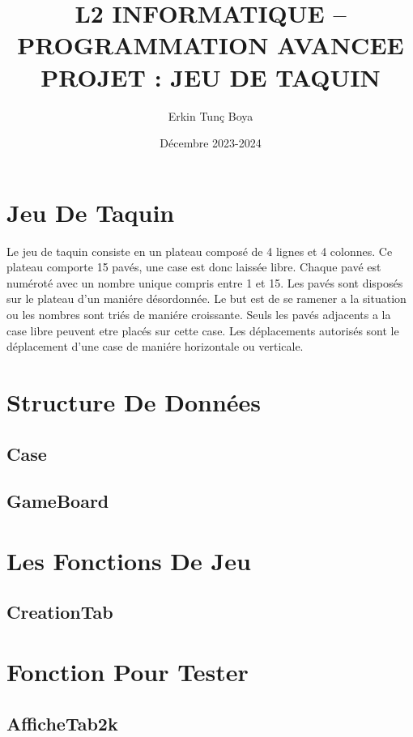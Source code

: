 \documentclass{article}
\title{L2 INFORMATIQUE – PROGRAMMATION AVANCEE \\ PROJET : JEU DE TAQUIN}
\author{Erkin Tunç Boya}
\date{Décembre 2023-2024}
\begin{document}
\maketitle
\tableofcontents
\newpage


\section{Jeu De Taquin}
Le jeu de taquin consiste en un
plateau composé de 4 lignes et 4 colonnes. Ce plateau comporte 15 pavés, une case est donc
laissée libre. Chaque pavé est numéroté avec un nombre unique compris entre 1 et 15.
Les pavés sont disposés sur le plateau d’un maniére désordonnée. Le but est de se ramener a la
situation ou les nombres sont triés de maniére croissante. Seuls les pavés adjacents a la case libre
peuvent etre placés sur cette case. Les déplacements autorisés sont le déplacement d’une case de
maniére horizontale ou verticale.


\section{Structure De Données}

\subsection{Case}

\subsection{GameBoard}


\section{Les Fonctions De Jeu}

\subsection{CreationTab}


\section{Fonction Pour Tester}

\subsection{AfficheTab2k}
\end{document}
